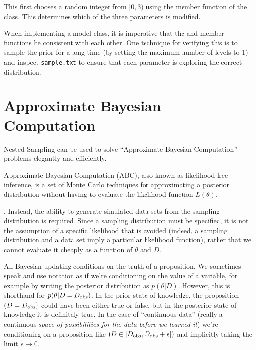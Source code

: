\documentclass[article]{jss}
\newcommand{\params}{\theta}
\newcommand{\data}{D}
\newcommand{\dobs}{D_{\rm obs}}
\begin{document}
This first chooses a random integer from $[0, 3)$ using the
 member function of the  class.
This determines which of the three parameters is modified.


When implementing a model class, it is imperative that the
 and 
member functions be consistent with each other. One technique
for verifying this is to sample the prior for a long time
(by setting the maximum number of levels to 1) and inspect
{\tt sample.txt} to ensure that each parameter is exploring
the correct distribution.

\section{Approximate Bayesian Computation}
Nested Sampling can be used to solve ``Approximate Bayesian Computation''
problems elegantly and efficiently.

Approximate Bayesian Computation (ABC), also known as likelihood-free inference,
is a set of Monte Carlo techniques for approximating a posterior distribution
without having to evaluate the likelihood function $L(\theta)$.

. Instead, the ability to
generate simulated data sets from the sampling distribution is required.
Since a sampling distribution must be specified, it is not the assumption of
a specific likelihood that is avoided (indeed, a sampling distribution and
a data set imply a particular likelihood function), rather that we cannot
evaluate it cheaply as a function of $\params$ and $\data$.

All Bayesian updating conditions on the truth of a proposition. We sometimes
speak and use notation as if we're conditioning on the value of a variable, for
example by writing the posterior distribution as $p(\params | \data)$. However,
this is shorthand for $p(\params | \data = \dobs)$. In the prior state of
knowledge, the proposition $(\data = \dobs)$ could have been either true or
false, but in the posterior state of knowledge it is definitely true.
In the case of ``continuous data'' (really a continuous {\it space of
possibilities for the data before we learned it}) we're conditioning on a
proposition like $(\data \in [\dobs, \dobs+\epsilon])$ and implicitly
taking the limit $\epsilon \to 0$.
\end{document}
